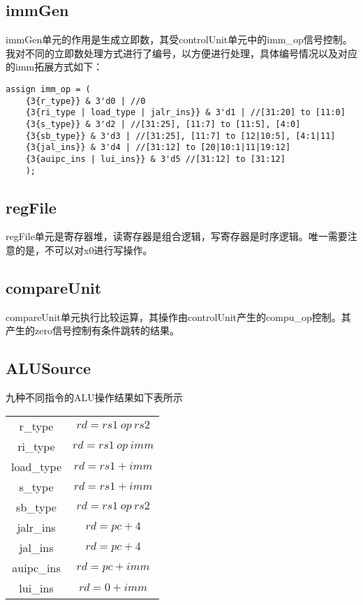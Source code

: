\documentclass{article}
\begin{document}
        \subsection{immGen}
            \par{}
            immGen单元的作用是生成立即数，其受controlUnit单元中的imm\_op信号控制。我对不同的立即数处理方式进行了编号，以方便进行处理，具体编号情况以及对应的imm拓展方式如下：

            \begin{verbatim}
assign imm_op = (
    {3{r_type}} & 3'd0 | //0
    {3{ri_type | load_type | jalr_ins}} & 3'd1 | //[31:20] to [11:0]
    {3{s_type}} & 3'd2 | //[31:25], [11:7] to [11:5], [4:0]
    {3{sb_type}} & 3'd3 | //[31:25], [11:7] to [12|10:5], [4:1|11]
    {3{jal_ins}} & 3'd4 | //[31:12] to [20|10:1|11|19:12]
    {3{auipc_ins | lui_ins}} & 3'd5 //[31:12] to [31:12]
    );
            \end{verbatim}

        \subsection{regFile}
            \par{}
            regFile单元是寄存器堆，读寄存器是组合逻辑，写寄存器是时序逻辑。唯一需要注意的是，不可以对x0进行写操作。

        \subsection{compareUnit}
            \par{}
            compareUnit单元执行比较运算，其操作由controlUnit产生的compu\_op控制。其产生的zero信号控制有条件跳转的结果。

        \subsection{ALUSource}
            \par{}
            九种不同指令的ALU操作结果如下表所示

            \begin{center}
                \begin{tabular}{|c|c|}
                \hline
                r\_type & $rd = rs1 \ op \ rs2$ \\
                ri\_type & $rd = rs1 \ op \  imm$ \\
                load\_type & $rd = rs1 + imm$ \\
                s\_type & $rd = rs1 + imm$ \\
                sb\_type & $rd = rs1 \ op \  rs2$ \\
                jalr\_ins & $rd = pc + 4$ \\
                jal\_ins & $rd = pc + 4$ \\
                auipc\_ins & $rd = pc + imm$ \\
                lui\_ins & $rd = 0 + imm$ \\
                \hline
                \end{tabular}
            \end{center}
            
\end{document}
